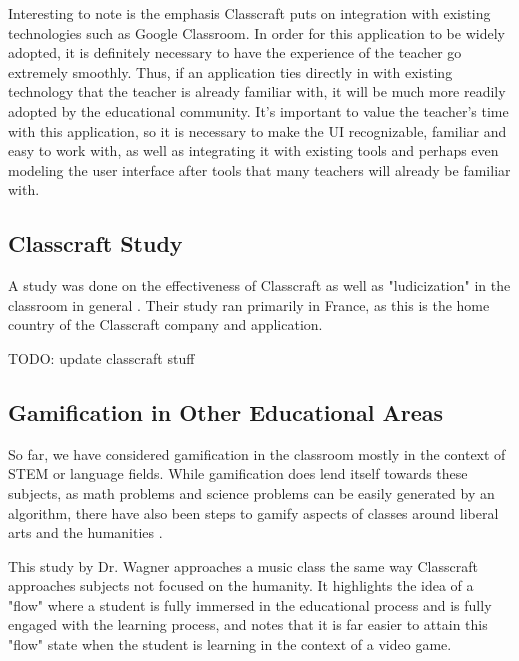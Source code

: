 Interesting to note is the emphasis Classcraft puts on integration with existing technologies such as Google Classroom. In order for this application to be widely adopted, it is definitely necessary to have the experience of the teacher go extremely smoothly. Thus, if an application ties directly in with existing technology that the teacher is already familiar with, it will be much more readily adopted by the educational community. It's important to value the teacher's time with this application, so it is necessary to make the UI recognizable, familiar and easy to work with, as well as integrating it with existing tools and perhaps even modeling the user interface after tools that many teachers will already be familiar with.

\subsection{Classcraft Study}
A study was done on the effectiveness of Classcraft as well as "ludicization" in the classroom in general \cite{sanchez2016classcraft}. Their study ran primarily in France, as this is the home country of the Classcraft company and application.

TODO: update classcraft stuff

\subsection{Gamification in Other Educational Areas}
So far, we have considered gamification in the classroom mostly in the context of STEM or language fields. While gamification does lend itself towards these subjects, as math problems and science problems can be easily generated by an algorithm, there have also been steps to gamify aspects of classes around liberal arts and the humanities \cite{wagner2017digital}. 

This study by Dr. Wagner approaches a music class the same way Classcraft approaches subjects not focused on the humanity. It highlights the idea of a "flow" where a student is fully immersed in the educational process and is fully engaged with the learning process, and notes that it is far easier to attain this "flow" state when the student is learning in the context of a video game.